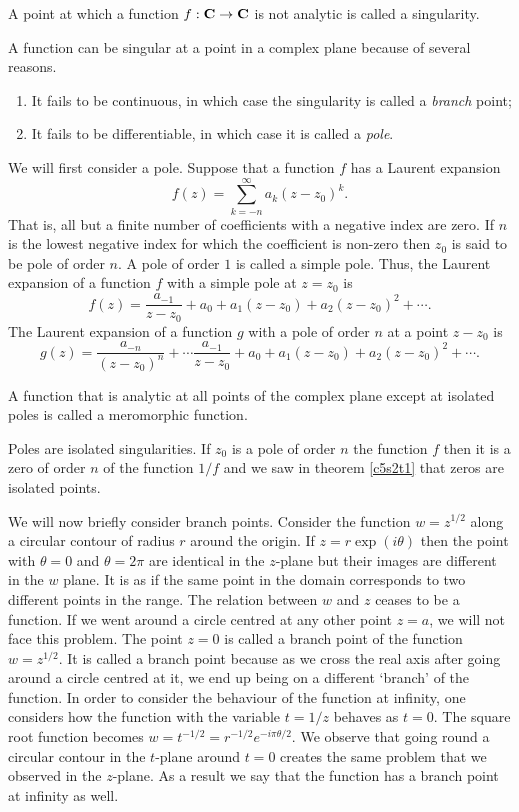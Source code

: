 \begin{defn}\label{c5s2d2}
A point at which a function $f: \mathbf{C} \rightarrow \mathbf{C}$ is not analytic is 
called a singularity.
\end{defn}

A function can be singular at a point in a complex plane because of several
reasons.
\begin{enumerate}
\item It fails to be continuous, in which case the singularity is called a 
\emph{branch} point;
\item It fails to be differentiable, in which case it is called a \emph{pole}.
\end{enumerate}

We will first consider a pole. Suppose that a function $f$ has a Laurent
expansion
\[
f(z) = \sum_{k=-n}^\infty a_k (z - z_0)^k.
\]
That is, all but a finite number of coefficients with a negative index are zero.
If $n$ is the lowest negative index for which the coefficient is non-zero then
$z_0$ is said to be pole of order $n$. A pole of order $1$ is called a simple
pole. Thus, the Laurent expansion of a function $f$ with a simple pole at 
$z = z_0$ is
\[
f(z) = \frac{a_{-1}}{z - z_0} + a_0 + a_1(z - z_0) + a_2(z - z_0)^2 + \cdots.
\]
The Laurent expansion of a function $g$ with a pole of order $n$ at a point
$z - z_0$ is
\[
g(z) = \frac{a_{-n}}{(z - z_0)^n} + \cdots \frac{a_{-1}}{z - z_0} + a_0 + 
a_1(z - z_0) + a_2(z - z_0)^2 + \cdots.
\]

\begin{defn}\label{c5s2d3}
A function that is analytic at all points of the complex plane except at 
isolated poles is called a meromorphic function.
\end{defn}

Poles are isolated singularities. If $z_0$ is a pole of order $n$ the function 
$f$ then it is a zero of order $n$ of the function $1/f$ and we saw in theorem
\ref{c5s2t1} that zeros are isolated points.

We will now briefly consider branch points. Consider the function $w = z^{1/2}$
along a circular contour of radius $r$ around the origin. If $z=r\exp(i\theta)$
then the point with $\theta = 0$ and $\theta = 2\pi$ are identical in the 
$z$-plane but their images are different in the $w$ plane. It is as if the same
point in the domain corresponds to two different points in the range. The 
relation between $w$ and $z$ ceases to be a function. If we went around a circle
centred at any other point $z = a$, we will not face this problem. The point $z
= 0$ is called a branch point of the function $w = z^{1/2}$. It is called a 
branch point because as we cross the real axis after going around a circle
centred at it, we end up being on a different `branch' of the function. In order
to consider the behaviour of the function at infinity, one considers
how the function with the variable $t = 1/z$ behaves as $t = 0$. The square
root function becomes $w=t^{-1/2}=r^{-1/2}e^{-i\pi\theta/2}$. We observe that
going round a circular contour in the $t$-plane around $t = 0$ creates the same
problem that we observed in the $z$-plane. As a result we say that the function
has a branch point at infinity as well.

